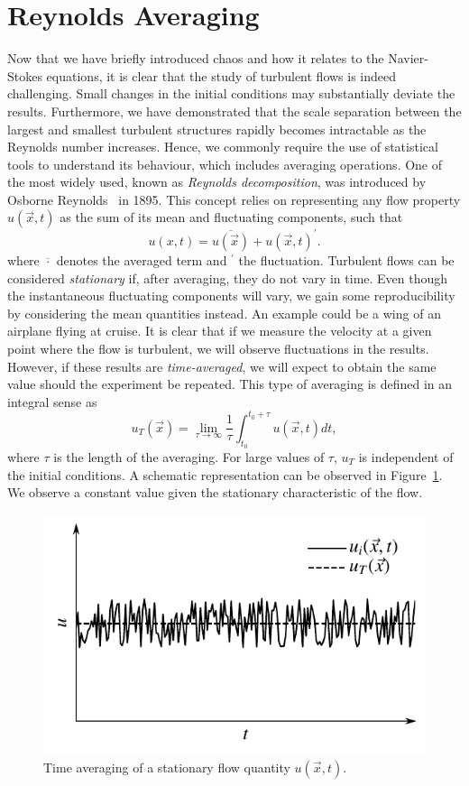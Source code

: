 \section{Reynolds Averaging}
Now that we have briefly introduced chaos and how it relates to the Navier-Stokes equations, it is clear that the study of turbulent flows is indeed challenging. Small changes in the initial conditions may substantially deviate the results. Furthermore, we have demonstrated that the scale separation between the largest and smallest turbulent structures rapidly becomes intractable as the Reynolds number increases. Hence, we commonly require the use of statistical tools to understand its behaviour, which includes averaging operations. One of the most widely used, known as \textit{Reynolds decomposition}, was introduced by Osborne Reynolds~\cite{reynoldsIVDynamicalTheory1895} in 1895. This concept relies on representing any flow property $u(\vec{x},t)$ as the sum of its mean and fluctuating components, such that
\begin{equation}
	u(x,t) = \overline{u(\vec{x})} + u(\vec{x},t)^\prime.
	\label{eq:reynolds_decomp}
\end{equation}
where $\overline{\cdot}$ denotes the averaged term and $^\prime$ the fluctuation.
Turbulent flows can be considered \textit{stationary} if, after averaging, they do not vary in time. Even though the instantaneous fluctuating components will vary, we gain some reproducibility by considering the mean quantities instead. An example could be a wing of an airplane flying at cruise. It is clear that if we measure the velocity at a given point where the flow is turbulent, we will observe fluctuations in the results. However, if these results are \textit{time-averaged}, we will expect to obtain the same value should the experiment be repeated. This type of averaging is defined in an integral sense as
\begin{equation}
	u_T(\vec{x}) = \lim_{\tau\rightarrow\infty} \frac{1}{\tau} \int_{t_0}^{t_0+\tau} u(\vec{x},t)dt,
	\label{eq:time_averaging}
\end{equation}
where $\tau$ is the length of the averaging. For large values of $\tau$, $u_T$ is independent of the initial conditions. A schematic representation can be observed in Figure~\ref{fig:time_averaging}. We observe a constant value given the stationary characteristic of the flow.
\begin{figure}[htbp]
	\centering
	\includegraphics[width=0.6\linewidth]{Pictures/time_averaging}
	\caption{Time averaging of a stationary flow quantity $u(\vec{x},t).$}
	\label{fig:time_averaging}
\end{figure}

